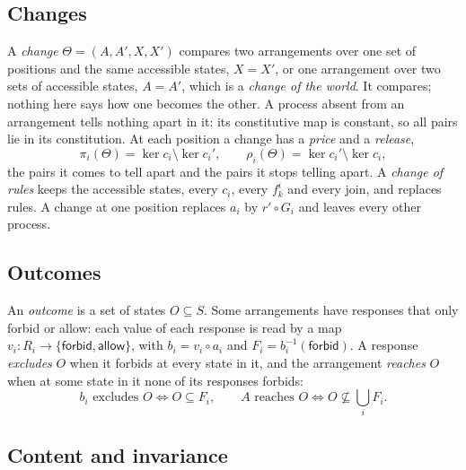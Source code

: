 \documentclass[11pt]{amsart}
\newcommand{\forbid}{\mathsf{forbid}}
\newcommand{\allow}{\mathsf{allow}}
\theoremstyle{plain}
\begin{document}
\subsection{Changes}

A \emph{change} $\Theta=(A,A',X,X')$ compares two arrangements over one set of positions and the same accessible states, $X=X'$, or one arrangement over two sets of accessible states, $A=A'$, which is a \emph{change of the world}. It compares; nothing here says how one becomes the other. A process absent from an arrangement tells nothing apart in it: its constitutive map is constant, so all pairs lie in its constitution. At each position a change has a \emph{price} and a \emph{release},
\begin{equation}\label{eq:price}
  \pi_i(\Theta)=\ker c_i\setminus\ker c_i',\qquad\rho_i(\Theta)=\ker c_i'\setminus\ker c_i,
\end{equation}
the pairs it comes to tell apart and the pairs it stops telling apart. A \emph{change of rules} keeps the accessible states, every $c_i$, every $f^i_k$ and every join, and replaces rules. A change at one position replaces $a_i$ by $r'\circ G_i$ and leaves every other process.

\subsection{Outcomes}

An \emph{outcome} is a set of states $O\subseteq S$. Some arrangements have responses that only forbid or allow: each value of each response is read by a map $v_i:R_i\to\{\forbid,\allow\}$, with $b_i=v_i\circ a_i$ and $F_i=b_i^{-1}(\forbid)$. A response \emph{excludes} $O$ when it forbids at every state in it, and the arrangement \emph{reaches} $O$ when at some state in it none of its responses forbids:
\begin{equation}\label{eq:outcome}
  b_i\text{ excludes }O\iff O\subseteq F_i,\qquad A\text{ reaches }O\iff O\not\subseteq\bigcup_iF_i.
\end{equation}

\subsection{Content and invariance}
\end{document}
